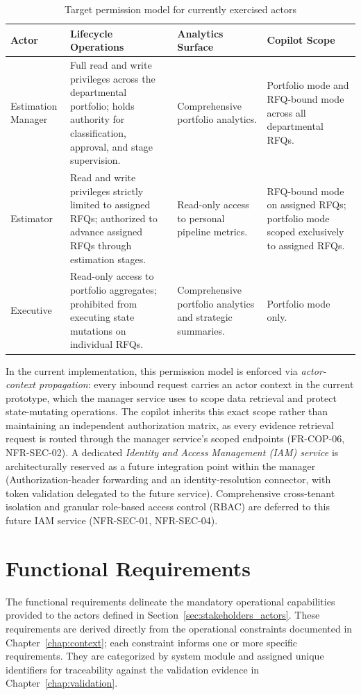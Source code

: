\begin{table}[H]
\centering
\renewcommand{\arraystretch}{1.3}
\scriptsize
\begin{tabularx}{\textwidth}{|p{2.5cm}|>{\RaggedRight\arraybackslash}X|>{\RaggedRight\arraybackslash}X|>{\RaggedRight\arraybackslash}X|}
\hline
\rowcolor{lightgray}
\textbf{Actor} & \textbf{Lifecycle Operations} & \textbf{Analytics Surface} & \textbf{Copilot Scope} \\ \hline
Estimation Manager & Full read and write privileges across the departmental portfolio; holds authority for classification, approval, and stage supervision. & Comprehensive portfolio analytics. & Portfolio mode and RFQ-bound mode across all departmental RFQs. \\ \hline
Estimator & Read and write privileges strictly limited to assigned RFQs; authorized to advance assigned RFQs through estimation stages. & Read-only access to personal pipeline metrics. & RFQ-bound mode on assigned RFQs; portfolio mode scoped exclusively to assigned RFQs. \\ \hline
Executive & Read-only access to portfolio aggregates; prohibited from executing state mutations on individual RFQs. & Comprehensive portfolio analytics and strategic summaries. & Portfolio mode only. \\ \hline
\end{tabularx}
\caption{Target permission model for currently exercised actors}
\label{tab:permissions}
\end{table}

In the current implementation, this permission model is enforced via \textit{actor-context propagation}: every inbound request carries an actor context in the current prototype, which the manager service uses to scope data retrieval and protect state-mutating operations. The copilot inherits this exact scope rather than maintaining an independent authorization matrix, as every evidence retrieval request is routed through the manager service's scoped endpoints (FR-COP-06, NFR-SEC-02). A dedicated \textit{Identity and Access Management (IAM) service} is architecturally reserved as a future integration point within the manager (Authorization-header forwarding and an identity-resolution connector, with token validation delegated to the future service). Comprehensive cross-tenant isolation and granular role-based access control (RBAC) are deferred to this future IAM service (NFR-SEC-01, NFR-SEC-04).


\section{Functional Requirements}\label{sec:functional_requirements}
The functional requirements delineate the mandatory operational capabilities provided to the actors defined in Section~\ref{sec:stakeholders_actors}. These requirements are derived directly from the operational constraints documented in Chapter~\ref{chap:context}; each constraint informs one or more specific requirements. They are categorized by system module and assigned unique identifiers for traceability against the validation evidence in Chapter~\ref{chap:validation}.

